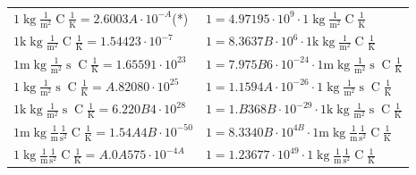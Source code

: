 \begin{center}
\begin{longtable}{l l}
{\color{black}$1 \bm{\mathrm{ }}\operatorname{kg}\frac1{\operatorname{m}^2}{}{\operatorname{C}}\frac1{\operatorname{K}} = 2.6003A\cdot10^{-A} $}\quad(*) & {\color{black}$ 1 = 4.97195\cdot10^{9} \cdot 1 \bm{\mathrm{ }}\operatorname{kg}\frac1{\operatorname{m}^2}{}{\operatorname{C}}\frac1{\operatorname{K}}$}  \\
{\color{gray}$1 \bm{\mathrm{ k}}\operatorname{kg}\frac1{\operatorname{m}^2}{}{\operatorname{C}}\frac1{\operatorname{K}} = 1.54423\cdot10^{-7} $}   & {\color{gray}$ 1 = 8.3637B\cdot10^{6} \cdot 1 \bm{\mathrm{ k}}\operatorname{kg}\frac1{\operatorname{m}^2}{}{\operatorname{C}}\frac1{\operatorname{K}}$}  \\
{\color{gray}$1 \bm{\mathrm{ m}}\operatorname{kg}\frac1{\operatorname{m}^2}{\operatorname{s}}{\operatorname{C}}\frac1{\operatorname{K}} = 1.65591\cdot10^{23} $}   & {\color{gray}$ 1 = 7.975B6\cdot10^{-24} \cdot 1 \bm{\mathrm{ m}}\operatorname{kg}\frac1{\operatorname{m}^2}{\operatorname{s}}{\operatorname{C}}\frac1{\operatorname{K}}$}  \\
{\color{black}$1 \bm{\mathrm{ }}\operatorname{kg}\frac1{\operatorname{m}^2}{\operatorname{s}}{\operatorname{C}}\frac1{\operatorname{K}} = A.82080\cdot10^{25} $}   & {\color{black}$ 1 = 1.1594A\cdot10^{-26} \cdot 1 \bm{\mathrm{ }}\operatorname{kg}\frac1{\operatorname{m}^2}{\operatorname{s}}{\operatorname{C}}\frac1{\operatorname{K}}$}  \\
{\color{gray}$1 \bm{\mathrm{ k}}\operatorname{kg}\frac1{\operatorname{m}^2}{\operatorname{s}}{\operatorname{C}}\frac1{\operatorname{K}} = 6.220B4\cdot10^{28} $}   & {\color{gray}$ 1 = 1.B368B\cdot10^{-29} \cdot 1 \bm{\mathrm{ k}}\operatorname{kg}\frac1{\operatorname{m}^2}{\operatorname{s}}{\operatorname{C}}\frac1{\operatorname{K}}$}  \\
{\color{gray}$1 \bm{\mathrm{ m}}\operatorname{kg}\frac1{\operatorname{m}}\frac1{\operatorname{s}^2}{\operatorname{C}}\frac1{\operatorname{K}} = 1.54A4B\cdot10^{-50} $}   & {\color{gray}$ 1 = 8.3340B\cdot10^{4B} \cdot 1 \bm{\mathrm{ m}}\operatorname{kg}\frac1{\operatorname{m}}\frac1{\operatorname{s}^2}{\operatorname{C}}\frac1{\operatorname{K}}$}  \\
{\color{black}$1 \bm{\mathrm{ }}\operatorname{kg}\frac1{\operatorname{m}}\frac1{\operatorname{s}^2}{\operatorname{C}}\frac1{\operatorname{K}} = A.0A575\cdot10^{-4A} $}   & {\color{black}$ 1 = 1.23677\cdot10^{49} \cdot 1 \bm{\mathrm{ }}\operatorname{kg}\frac1{\operatorname{m}}\frac1{\operatorname{s}^2}{\operatorname{C}}\frac1{\operatorname{K}}$}  \\

\end{longtable}
\end{center}

